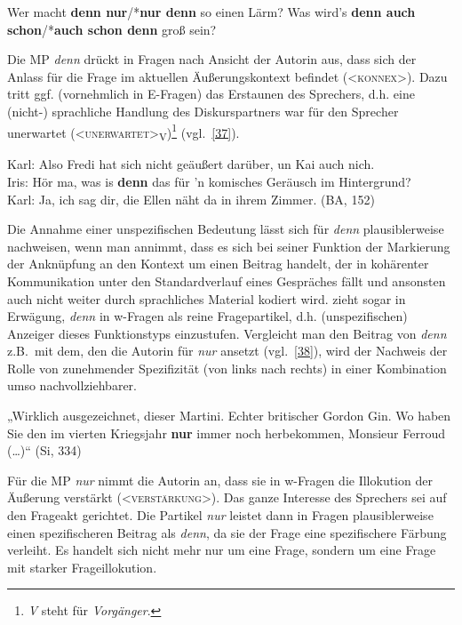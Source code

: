 \begin{exe}
	\ex\label{36} 
		\begin{xlist}	
			\ex\label{36a} Wer macht \textbf{denn nur}/*\textbf{nur denn} so einen Lärm?
			\ex\label{36b} Was wird’s \textbf{denn auch schon}/*\textbf{auch schon denn} groß sein?
		\end{xlist}
	\hfill\hbox{\citet[29]{Thurmair1991}}	
\end{exe}
Die MP \textit{denn} drückt in Fragen nach Ansicht der Autorin aus, dass sich der Anlass für die Frage im aktuellen Äußerungskontext befindet (<\textsc{konnex}>). Dazu tritt ggf. (vornehmlich in E-Fragen) das Erstaunen des Sprechers, d.h. eine (nicht-) \linebreak sprachliche Handlung des Diskurspartners war für den Sprecher unerwar\-tet \linebreak (<\textsc{unerwartet}>\textsubscript{V})\footnote{\textit{V} steht für \textit{Vorgänger}.} (vgl.\ \ref{37}).

\begin{exe}
	\ex\label{37} 
			Karl: Also Fredi hat sich nicht geäußert darüber, un Kai auch nich.\\
			Iris: Hör ma, was is \textbf{denn} das für 'n komisches Geräusch im Hintergrund?\\
			Karl: Ja, ich sag dir, die Ellen näht da in ihrem Zimmer. (BA, 152)
			\newline
			\hbox{}\hfill\hbox{\citet[166]{Thurmair1989}}	
\end{exe}
Die Annahme einer unspezifischen Bedeutung lässt sich für \textit{denn} plausiblerweise nachweisen, wenn man annimmt, dass es sich bei seiner Funktion der Markierung der Anknüpfung an den Kontext um einen Beitrag handelt, der in kohärenter Kommunikation unter den Standardverlauf eines Gespräches fällt und ansonsten auch nicht weiter durch sprachliches Material kodiert wird. \citet[170]{Thurmair1989} zieht sogar in Erwägung, \textit{denn} in w-Fragen  als reine Fragepartikel, d.h. (unspezifischen) Anzeiger dieses Funktionstyps einzustufen. Vergleicht man den Beitrag von \textit{denn} z.B.\ mit dem, den die Autorin für \textit{nur} ansetzt (vgl.\ \ref{38}), wird der Nachweis der Rolle von zunehmender Spezifizität (von links nach rechts) in einer Kombination umso nachvollziehbarer.

\begin{exe}
	\ex\label{38} 
		„Wirklich ausgezeichnet, dieser Martini. Echter britischer Gordon Gin. Wo haben Sie den im vierten Kriegsjahr \textbf{nur} immer noch herbekommen, Monsieur Ferroud (\ldots)“ (Si, 334) 			
	\hfill\hbox{\citet[179]{Thurmair1989}}	
\end{exe}
Für die MP \textit{nur} nimmt die Autorin an, dass sie in w-Fragen die Illokution der Äußerung verstärkt (<\textsc{verstärkung}>). Das ganze Interesse des Sprechers sei auf den Frageakt gerichtet. Die Partikel \textit{nur} leistet dann in Fragen  plausiblerweise einen spezifischeren Beitrag als \textit{denn}, da sie der Frage eine spezifischere Färbung verleiht. Es handelt sich nicht mehr nur um eine Frage, sondern um eine Frage mit starker Frageillokution.

